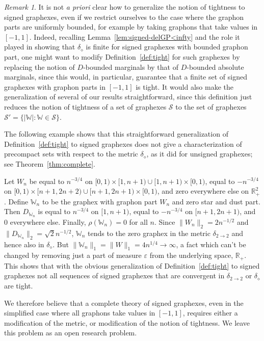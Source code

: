 \documentclass{amsart}
\numberwithin{equation}{section}
\numberwithin{figure}{section}
\theoremstyle{definition}
\theoremstyle{remark}
\newtheorem{remark}[theorem]{Remark}
\newcommand{\RR}{\mathbb{R}}
\newcommand{\cW}{\mathbb{W}}
\newcommand{\cS}{\mathcal{S}}
\newcommand{\deltt}{\delta_{2\to 2}}
\def\delGP{\delta_\diamond}
\begin{document}
\begin{remark}\label{rem:signed-tightness}
It is not \emph{a priori} clear how to generalize the notion of tightness to
signed graphexes, even if we restrict ourselves to the case where the graphon
parts are uniformly bounded, for example by taking graphons that take values
in $[-1,1]$. Indeed, recalling Lemma~\ref{lem:signed-delGP<infty} and the
role it played in showing that $\delGP$ is finite for signed graphexes with
bounded graphon part, one might want to modify Definition~\ref{def:tight}
 for such graphexes by replacing the notion of
$D$-bounded marginals by that of $D$-bounded absolute marginals, since this
would, in particular, guarantee that a finite set of signed graphexes with
graphon parts in $[-1,1]$ is tight. It would also make the generalization of
several of our results straightforward, since this definition just reduces
the notion of tightness of a set of graphexes $\cS$ to the set of graphexes
$\cS'=\{|\cW| : \cW\in \cS\}$.

The following example shows that this straightforward generalization of
Definition~\ref{def:tight} to signed graphexes does not give a
characterization of precompact sets with respect to the metric $\delGP$, as
it did for unsigned graphexes; see Theorem~\ref{thm:complete}.

Let $W_n$ be equal to $n^{-3/4}$ on $[0,1)\times[1,n+1)\cup [1,n+1)\times
[0,1)$, equal to $-n^{-3/4}$ on $[0,1)\times[n+1,2n+2)\cup [n+1,2n+1)\times
[0,1)$, and zero everywhere else on $\RR_+^2$. Define $\cW_n$ to be the
graphex with graphon part $W_n$ and zero star and dust part. Then $D_{\cW_n}$
is equal to $n^{-3/4}$ on $[1,n+1)$, equal to $-n^{-3/4}$ on $[n+1,2n+1)$,
and $0$ everywhere else. Finally, $\rho(\cW_n)= 0$ for all $n$. Since
$\|W_n\|_2=2n^{-1/2}$ and $\|D_{\cW_n}\|_2=\sqrt 2 n^{-1/2}$, $\cW_n$ tends
to the zero graphex in the metric $\deltt$ and hence also in $\delGP$. But
$\|\cW_n\|_1=\|W\|_1=4 n^{1/4}\to\infty$, a fact which can't be changed by
removing just a part of measure $\varepsilon$ from the underlying space,
$\RR_+$. This shows that with the obvious generalization of
Definition~\ref{def:tight} to signed graphexes not all sequences of signed
graphexes that are convergent in $\deltt$ or $\delGP$ are tight.

We therefore believe that a complete theory of signed graphexes, even in the
simplified case where all graphons take values in $[-1,1]$, requires either a
modification of the metric, or modification of the notion of tightness. We
leave this problem as an open research problem.
\end{remark}
\end{document}
